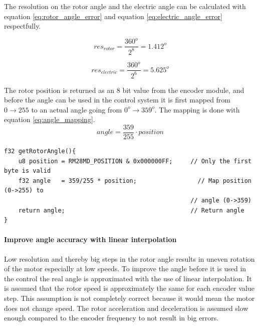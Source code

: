 The resolution on the rotor angle and the electric angle can be calculated with equation \ref{eq:rotor_angle_error} and equation \ref{eq:electric_angle_error} respectfully. 

\begin{equation}
res_{rotor} = \frac{360^o}{2^8} = 1.412^o
\label{eq:rotor_angle_error}
\end{equation}

\begin{equation}
res_{electric} = \frac{360^o}{2^6} = 5.625^o
\label{eq:electric_angle_error}
\end{equation}




The rotor position is returned as an 8 bit value from the encoder module, and before the angle can be used in the control system it is first mapped from $0 \rightarrow 255$ to an actual angle going from $0^o \rightarrow 359^o$. The mapping is done with equation \ref{eq:angle_mapping}.
\begin{equation}
    angle = \frac{359}{255} \cdot position
    \label{eq:angle_mapping}
\end{equation}



\begin{lstlisting}[style=c, caption=Function to read an angle from the encoder. The angle is returned in degrees., label=code:encoder_angle_function]
f32 getRotorAngle(){
    u8 position = RM28MD_POSITION & 0x000000FF;     // Only the first byte is valid
    f32 angle   = 359/255 * position;       	      // Map position (0->255) to 
                                                    // angle (0->359)
    return angle;                                   // Return angle
}
\end{lstlisting}


\paragraph{Improve angle accuracy with linear interpolation}
\label{sec:linear_interpolation}
Low resolution and thereby big steps in the rotor angle results in uneven rotation of the motor especially at low speeds.
To improve the angle before it is used in the control the real angle is approximated with the use of linear interpolation. It is assumed that the rotor speed is approximately the same for each encoder value step. This assumption is not completely correct because it would mean the motor does not change speed. The rotor acceleration and deceleration is assumed slow enough compared to the encoder frequency to not result in big errors.


